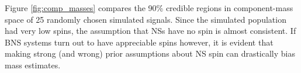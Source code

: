 Figure \ref{fig:comp_masses} compares the 90\% credible regions in component-mass space of 25 randomly chosen simulated signals.  Since the simulated population had very low spins, the assumption that NSs have no spin is almost consistent.  If BNS systems turn out to have appreciable spins however, it is evident that making strong (and wrong) prior assumptions about NS spin can drastically bias mass estimates.
